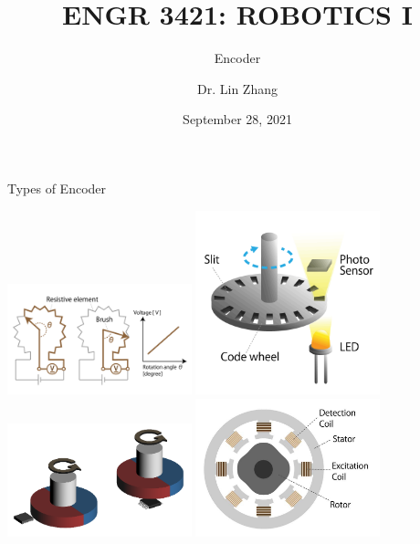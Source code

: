 \documentclass[12pt,letterpaper]{beamer}
\title[Robotics I]
{ENGR 3421: ROBOTICS I}
\subtitle{Encoder}
\author[Zhang, Lin]
{Dr. Lin Zhang}
\institute[UCA] %
{
  Department of Physics and Astronomy\\
  University of Central Arkansas
}
\date[Robotics1 2021] %
{September 28, 2021}
\begin{document}
\frame{\titlepage}
% 

\begin{frame}{Types of Encoder}

\centering
\includegraphics[width=0.4\textwidth]{mechanical_encoder}
\includegraphics[width=0.4\textwidth]{optical_encoder}
\includegraphics[width=0.4\textwidth]{magnetic_encoder}
\includegraphics[width=0.4\textwidth]{electromagnetic_encoder}

\end{frame}
\end{document}
